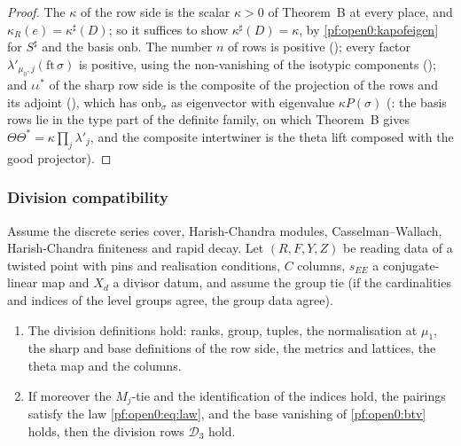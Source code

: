 \begin{proof}
The $\kappa$ of the row side is the scalar $\kappa>0$ of Theorem~B at every place, and $\kappa_R(e)=\kappa^\sharp(D)$; so it suffices to
show $\kappa^\sharp(D)=\kappa$, by \cref{pf:open0:kapofeigen} for $S^\sharp$ and the basis $\mathrm{onb}$. The number $n$ of rows is positive
(); every factor $\lambda'_{\mu_0,j}(\mathrm{ft}\,\sigma)$ is positive, using the non-vanishing of the
isotypic components (); and $\iota\iota^*$ of the sharp
row side is the composite of the projection of the rows and its adjoint (), which has
$\mathrm{onb}_\sigma$ as eigenvector with eigenvalue $\kappa P(\sigma)$
(: the basis rows lie in the type part of the definite family, on
which Theorem~B gives $\Theta\Theta^*=\kappa\prod_j\lambda'_j$, and the composite intertwiner is the theta lift composed with the good
projector).
\end{proof}

\subsubsection{Division compatibility}\label{sec:pf:open0:divc}

\begin{proposition}\label{pf:open0:divcompat}
Assume the discrete series cover, Harish-Chandra modules, Casselman--Wallach, Harish-Chandra finiteness and rapid decay. Let
$(R,F,Y,Z)$ be reading data of a twisted point with pins and realisation conditions, $C$ columns, $s_{EE}$ a conjugate-linear map and
$X_d$ a divisor datum, and assume the group tie (if the cardinalities and indices of the level groups agree, the group data agree).
\begin{enumerate}[label=(\alph*)]
\item The division definitions hold: ranks, group, tuples, the normalisation at $\mu_1$, the sharp and base definitions of the row
side, the metrics and lattices, the theta map and the columns.
\item If moreover the $M_j$-tie and the identification of the indices hold, the pairings satisfy the law \eqref{pf:open0:eq:law}, and the
base vanishing of \cref{pf:open0:btv} holds, then the division rows $\mathcal D_3$ hold.
\end{enumerate}
\ 
\end{proposition}


